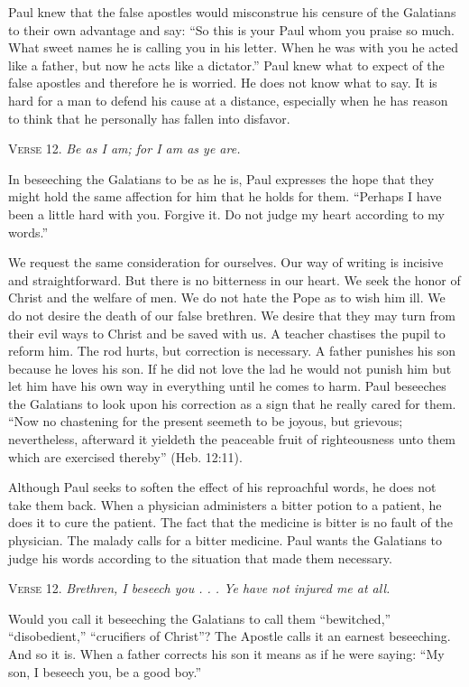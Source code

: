 Paul knew that the false apostles would misconstrue his censure of the Galatians to their own advantage and say: “So this is your Paul whom you praise so much. What sweet names he is calling you in his letter. When he was with you he acted like a father, but now he acts like a dictator.” Paul knew what to expect of the false apostles and therefore he is worried. He does not know what to say. It is hard for a man to defend his cause at a distance, especially when he has reason to think that he personally has fallen into disfavor.

\textsc{Verse} 12. \emph{Be as I am; for I am as ye are.}

In beseeching the Galatians to be as he is, Paul expresses the hope that they might hold the same affection for him that he holds for them. “Perhaps I have been a little hard with you. Forgive it. Do not judge my heart according to my words.”

We request the same consideration for ourselves. Our way of writing is incisive and straightforward. But there is no bitterness in our heart. We seek the honor of Christ and the welfare of men. We do not hate the Pope as to wish him ill. We do not desire the death of our false brethren. We desire that they may turn from their evil ways to Christ and be saved with us. A teacher chastises the pupil to reform him. The rod hurts, but correction is necessary. A father punishes his son because he loves his son. If he did not love the lad he would not punish him but let him have his own way in everything until he comes to harm. Paul beseeches the Galatians to look upon his correction as a sign that he really cared for them. “Now no chastening for the present seemeth to be joyous, but grievous; nevertheless, afterward it yieldeth the peaceable fruit of righteousness unto them which are exercised thereby” (Heb. 12:11).

Although Paul seeks to soften the effect of his reproachful words, he does not take them back. When a physician administers a bitter potion to a patient, he does it to cure the patient. The fact that the medicine is bitter is no fault of the physician. The malady calls for a bitter medicine. Paul wants the Galatians to judge his words according to the situation that made them necessary.

\textsc{Verse} 12. \emph{Brethren, I beseech you . . . Ye have not injured me at all.}

Would you call it beseeching the Galatians to call them “bewitched,” “disobedient,” “crucifiers of Christ”? The Apostle calls it an earnest beseeching. And so it is. When a father corrects his son it means as if he were saying: “My son, I beseech you, be a good boy.”


